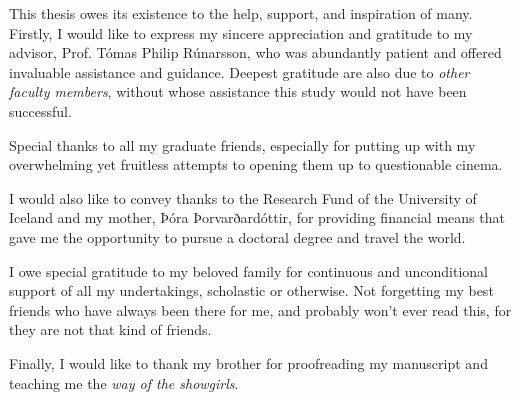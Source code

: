 This thesis owes its existence to the help, support, and inspiration of many. 
Firstly, I would like to express my sincere appreciation and gratitude to my 
advisor, Prof. Tómas Philip Rúnarsson, who was abundantly patient and offered 
invaluable assistance and guidance. Deepest gratitude are also due to 
\emph{other faculty members}, without whose assistance this study would not 
have been successful.

Special thanks to all my graduate friends, especially for putting up with my overwhelming yet fruitless attempts to opening them up to questionable cinema. 

I would also like to convey thanks to the Research Fund of the University of Iceland and my mother, Þóra Þorvarðardóttir, for providing financial means that gave me the opportunity to pursue a doctoral degree and travel the world. %

I owe special gratitude to my beloved family for continuous and unconditional support of all my undertakings, scholastic or otherwise. Not forgetting my best friends who have always been there for me, and probably won't ever read this, for they are not that kind of friends. 

Finally, I would like to thank my brother for proofreading my manuscript and 
teaching me the \emph{way of the showgirls}.